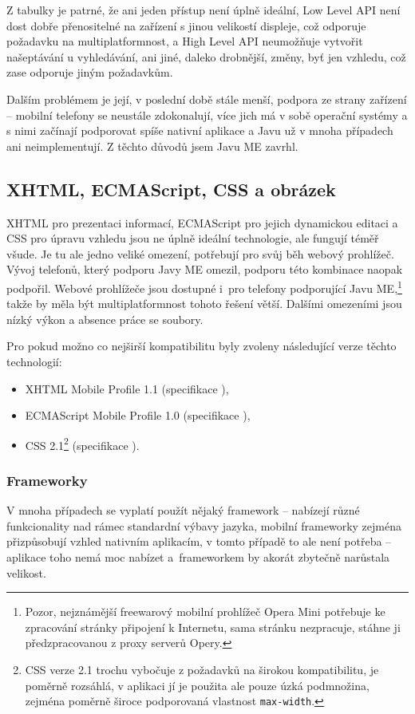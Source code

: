 Z tabulky je patrné, že ani jeden přístup není úplně ideální, Low Level API není dost dobře přenositelné na zařízení s jinou velikostí displeje, což odporuje požadavku na multiplatformnost, a High Level API neumožňuje vytvořit našeptávání u vyhledávání, ani jiné, daleko drobnější, změny, byť jen vzhledu, což zase odporuje jiným požadavkům.

Dalším problémem je její, v poslední době stále menší, podpora ze strany zařízení -- mobilní telefony se neustále zdokonalují, více jich má v sobě operační systémy a s nimi začínají podporovat spíše nativní aplikace a Javu už v mnoha případech ani neimplementují. Z těchto důvodů jsem Javu ME zavrhl.

\subsection{XHTML, ECMAScript, CSS a obrázek}
XHTML pro prezentaci informací, ECMAScript pro jejich dynamickou editaci a CSS pro úpravu vzhledu jsou ne úplně ideální technologie, ale fungují téměř všude. Je tu ale jedno veliké omezení, potřebují pro svůj běh webový prohlížeč. Vývoj telefonů, který podporu Javy ME omezil, podporu této kombinace naopak podpořil. Webové prohlížeče jsou dostupné i~pro telefony podporující Javu ME,\footnote{Pozor, nejznámější freewarový mobilní prohlížeč Opera Mini \cite{OperaMini} potřebuje ke zpracování stránky připojení k Internetu, sama stránku nezpracuje, stáhne ji předzpracovanou z proxy serverů Opery.} takže by měla být multiplatformnost tohoto řešení větší. Dalšími omezeními jsou nízký výkon a absence práce se soubory.

Pro pokud možno co nejširší kompatibilitu byly zvoleny následující verze těchto technologií:
\begin{itemize}
\item XHTML Mobile Profile 1.1 (specifikace \cite{XhtmlMpDoc}),
\item ECMAScript Mobile Profile 1.0 (specifikace \cite{EsMpDoc}),
\item CSS 2.1\footnote{CSS verze 2.1 trochu vybočuje z požadavků na širokou kompatibilitu, je poměrně rozsáhlá, v aplikaci jí je použita ale pouze úzká podmnožina, zejména poměrně široce podporovaná vlastnost \texttt{max-width}.} (specifikace \cite{CssDoc}).
\end{itemize}

\subsubsection{Frameworky}
V mnoha případech se vyplatí použít nějaký framework -- nabízejí různé funkcionality nad rámec standardní výbavy jazyka, mobilní frameworky zejména přizpůsobují vzhled nativním aplikacím, v tomto případě to ale není potřeba -- aplikace toho nemá moc nabízet a~frameworkem by akorát zbytečně narůstala velikost. 

